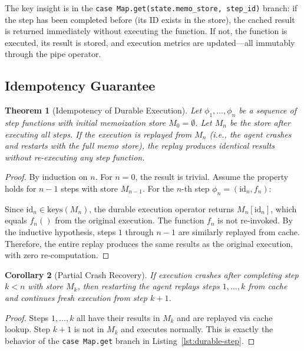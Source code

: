 \documentclass[12pt,a4paper]{article}
\newtheorem{theorem}{Theorem}[section]
\newtheorem{corollary}[theorem]{Corollary}
\theoremstyle{definition}
\theoremstyle{remark}
\begin{document}
The key insight is in the \texttt{case Map.get(state.memo\_store, step\_id)} branch: if the step has been completed before (its ID exists in the store), the cached result is returned immediately without executing the function. If not, the function is executed, its result is stored, and execution metrics are updated---all immutably through the pipe operator.

\subsection{Idempotency Guarantee}

\begin{theorem}[Idempotency of Durable Execution]\label{thm:idempotent-execution}
Let $\phi_1, \ldots, \phi_n$ be a sequence of step functions with initial memoization store $M_0 = \emptyset$. Let $M_n$ be the store after executing all steps. If the execution is replayed from $M_n$ (i.e., the agent crashes and restarts with the full memo store), the replay produces identical results without re-executing any step function.
\end{theorem}

\begin{proof}
By induction on $n$. For $n = 0$, the result is trivial. Assume the property holds for $n-1$ steps with store $M_{n-1}$. For the $n$-th step $\phi_n = (\text{id}_n, f_n)$:

Since $\text{id}_n \in \text{keys}(M_n)$, the durable execution operator returns $M_n[\text{id}_n]$, which equals $f_n()$ from the original execution. The function $f_n$ is not re-invoked. By the inductive hypothesis, steps $1$ through $n-1$ are similarly replayed from cache. Therefore, the entire replay produces the same results as the original execution, with zero re-computation.
\end{proof}

\begin{corollary}[Partial Crash Recovery]\label{cor:crash-recovery}
If execution crashes after completing step $k < n$ with store $M_k$, then restarting the agent replays steps $1, \ldots, k$ from cache and continues fresh execution from step $k+1$.
\end{corollary}

\begin{proof}
Steps $1, \ldots, k$ all have their results in $M_k$ and are replayed via cache lookup. Step $k+1$ is not in $M_k$ and executes normally. This is exactly the behavior of the \texttt{case Map.get} branch in Listing~\ref{lst:durable-step}.
\end{proof}
\end{document}
